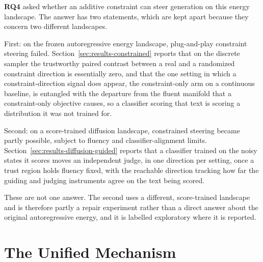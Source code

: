 \textbf{RQ4} asked whether an additive constraint can steer generation on this energy landscape. The answer has two statements, which are kept apart because they concern two different landscapes.

First: on the frozen autoregressive energy landscape, plug-and-play constraint steering failed. Section~\ref{sec:results-constrained} reports that on the discrete sampler the trustworthy paired contrast between a real and a randomized constraint direction is essentially zero, and that the one setting in which a constraint-direction signal does appear, the constraint-only arm on a continuous baseline, is entangled with the departure from the fluent manifold that a constraint-only objective causes, so a classifier scoring that text is scoring a distribution it was not trained for.

Second: on a score-trained diffusion landscape, constrained steering became partly possible, subject to fluency and classifier-alignment limits. Section~\ref{sec:results-diffusion-guided} reports that a classifier trained on the noisy states it scores moves an independent judge, in one direction per setting, once a trust region holds fluency fixed, with the reachable direction tracking how far the guiding and judging instruments agree on the text being scored.

These are not one answer. The second uses a different, score-trained landscape and is therefore partly a repair experiment rather than a direct answer about the original autoregressive energy, and it is labelled exploratory where it is reported.

\section{The Unified Mechanism}
\label{sec:disc-unified}

